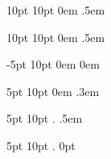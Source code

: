   {10pt}         %
  {10pt}         %
  {\normalfont}  %
  {0em}          %
  {\bfseries}    %
  {}            %
  {.5em}         %
  {} %

  {10pt}         %
  {10pt}         %
  {\normalfont}  %
  {0em}          %
  {\bfseries}    %
  {}            %
  {.5em}         %
  {} %

  {-5pt}         %
  {10pt}         %
  {\normalfont}  %
  {0em}          %
  {}    %
  {}            %
  {0em}         %
  {} %

  {5pt}         %
  {10pt}         %
  {\normalfont}  %
  {0em}          %
  {\bfseries}    %
  {}            %
  {.3em}         %
  {} %

  {5pt}         %
  {10pt}        %
  {\normalfont} %
  {}            %
  {\bfseries}   %
  {.}           %
  {.5em}           %
  {} %

  {5pt}         %
  {10pt}         %
  {\normalfont} %
  {}            %
  {\bfseries}   %
  {.}           %
  {0pt}         %
  {} %

